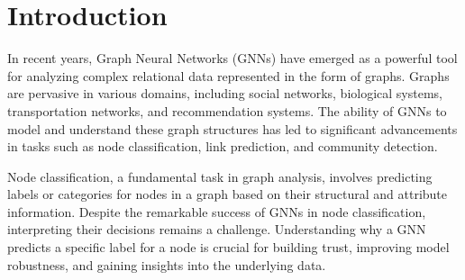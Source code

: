 \documentclass[binding=0.6cm]{sapthesis}
\begin{document}
\begin{abstract}
\end{abstract}

\tableofcontents
\mainmatter

\chapter{Introduction}
\label{chap:1-intro} 
In recent years, Graph Neural Networks (GNNs) have emerged as a powerful tool for analyzing complex relational data represented in the form of graphs. Graphs are pervasive in various domains, including social networks, biological systems, transportation networks, and recommendation systems. The ability of GNNs to model and understand these graph structures has led to significant advancements in tasks such as node classification, link prediction, and community detection.


Node classification, a fundamental task in graph analysis, involves predicting labels or categories for nodes in a graph based on their structural and attribute information. Despite the remarkable success of GNNs in node classification, interpreting their decisions remains a challenge. Understanding why a GNN predicts a specific label for a node is crucial for building trust, improving model robustness, and gaining insights into the underlying data.
\end{document}
